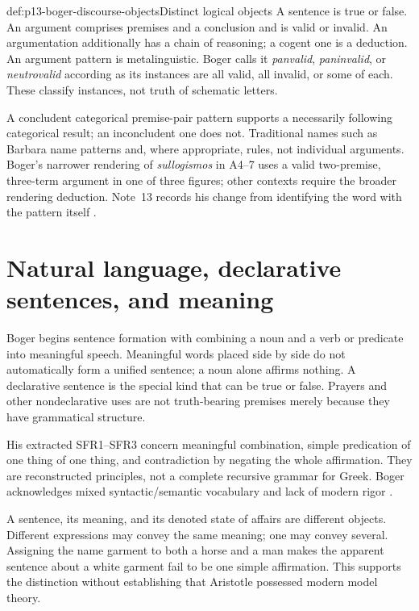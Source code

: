 \begin{hbdefinition}{def:p13-boger-discourse-objects}{Distinct logical objects}
A sentence is true or false. An argument comprises premises and a conclusion
and is valid or invalid. An argumentation additionally has a chain of
reasoning; a cogent one is a deduction. An argument pattern is
metalinguistic. Boger calls it \emph{panvalid}, \emph{paninvalid}, or
\emph{neutrovalid} according as its instances are all valid, all invalid,
or some of each. These classify instances, not truth of schematic letters.
\end{hbdefinition}

A concludent categorical premise-pair pattern supports a necessarily
following categorical result; an inconcludent one does not. Traditional
names such as Barbara name patterns and, where appropriate, rules, not
individual arguments. Boger's narrower rendering of \emph{sullogismos}
in A4--7 uses a valid two-premise, three-term argument in one of three
figures; other contexts require the broader rendering deduction.
Note~13 records his change from identifying the word with the pattern
itself \parencite[pp.~115--117]{Boger2004UnderlyingLogic}.

\section{Natural language, declarative sentences, and meaning}
\label{sec:p13-boger-natural-grammar}

Boger begins sentence formation with combining a noun and a verb or predicate
into meaningful speech. Meaningful words placed side by side do not
automatically form a unified sentence; a noun alone affirms nothing.
A declarative sentence is the special kind that can be true or false.
Prayers and other nondeclarative uses are not truth-bearing premises
merely because they have grammatical structure.

His extracted SFR1--SFR3 concern meaningful combination, simple predication
of one thing of one thing, and contradiction by negating the whole
affirmation. They are reconstructed principles, not a complete recursive
grammar for Greek. Boger acknowledges mixed syntactic/semantic vocabulary
and lack of modern rigor \parencite[pp.~118--126]{Boger2004UnderlyingLogic}.

A sentence, its meaning, and its denoted state of affairs are different
objects. Different expressions may convey the same meaning; one may
convey several. Assigning the name garment to both a horse and a man
makes the apparent sentence about a white garment fail to be one simple
affirmation. This supports the distinction without establishing that
Aristotle possessed modern model theory.

